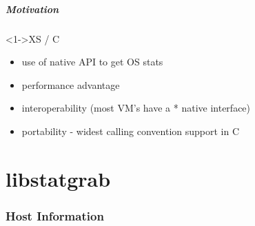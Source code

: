 \documentclass[ngerman,xcolor={table,dvipsnames},smaller,compress,hyperref={bookmarks,colorlinks}]{beamer}
\begin{document}
\begin{frame}[fragile]
\frametitle{Motivation}

\begin{block}<1->{XS / C}
\begin{itemize}
\item use of native API to get OS stats
\item performance advantage
\item interoperability (most VM's have a * native interface)
\item portability - widest calling convention support in C
\end{itemize}
\end{block}

\end{frame}

\part{libstatgrab}

\section{Host Information}
\end{document}
